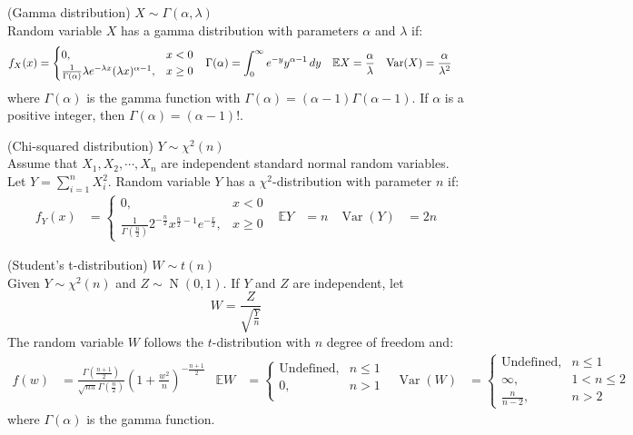 \documentclass{huhtakm-template-book}
\newcommand{\expect}{\mathbb{E}}
\DeclareMathOperator{\N}{N}
\DeclareMathOperator{\Var}{Var}
\begin{document}
\newpage
\begin{seg}(Gamma distribution) $X\sim\Gamma(\alpha,\lambda)$\\
	Random variable $X$ has a gamma distribution with parameters $\alpha$ and $\lambda$ if:
	\begin{align*}
		f_{X}(x)&=\begin{cases}
			0, &x<0\\
			\frac{1}{\Gamma(\alpha)}\lambda e^{-\lambda x}(\lambda x)^{\alpha-1}, &x\geq 0
		\end{cases} & \Gamma(\alpha)&=\intlu{0}{\infty}e^{-y}y^{\alpha-1}\,dy & \expect{X}&=\frac{\alpha}{\lambda} & \Var(X)&=\frac{\alpha}{\lambda^{2}}
	\end{align*}
	where $\Gamma(\alpha)$ is the gamma function with $\Gamma(\alpha)=(\alpha-1)\Gamma(\alpha-1)$. If $\alpha$ is a positive integer, then $\Gamma(\alpha)=(\alpha-1)!$.
\end{seg}
\begin{seg}(Chi-squared distribution) $Y\sim\chi^{2}(n)$\\
	Assume that $X_{1},X_{2},\cdots,X_{n}$ are independent standard normal random variables. Let $Y=\sum_{i=1}^{n}X_{i}^{2}$. Random variable $Y$ has a $\chi^{2}$-distribution with parameter $n$ if:
	\begin{align*}
		f_{Y}(x)&=\begin{cases}
			0, &x<0\\
			\frac{1}{\Gamma(\frac{n}{2})}2^{-\frac{n}{2}}x^{\frac{n}{2}-1}e^{-\frac{x}{2}}, &x\geq 0
		\end{cases} & \expect{Y}&=n & \Var(Y)&=2n
	\end{align*}
\end{seg}
\begin{seg}(Student's t-distribution) $W\sim t(n)$\\
	Given $Y\sim\chi^{2}(n)$ and $Z\sim\N(0,1)$. If $Y$ and $Z$ are independent, let
	\begin{equation*}
		W=\frac{Z}{\sqrt{\frac{Y}{n}}}
	\end{equation*}
	The random variable $W$ follows the $t$-distribution with $n$ degree of freedom and:
	\begin{align*}
		f(w)&=\frac{\Gamma\left(\frac{n+1}{2}\right)}{\sqrt{n\pi}\Gamma\left(\frac{n}{2}\right)}\left(1+\frac{w^{2}}{n}\right)^{-\frac{n+1}{2}} & \expect{W}&=\begin{cases}
			\text{Undefined}, &n\leq 1\\
			0, &n>1\\
		\end{cases} & \Var(W)&=\begin{cases}
			\text{Undefined}, &n\leq 1\\
			\infty, &1<n\leq 2\\
			\frac{n}{n-2}, &n>2
		\end{cases}
	\end{align*}
	where $\Gamma(\alpha)$ is the gamma function.
\end{seg}
\end{document}
